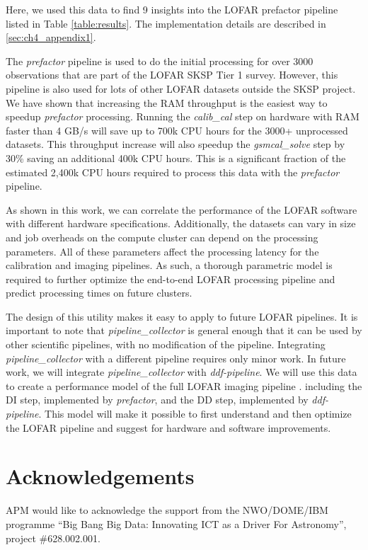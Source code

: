 Here, we used this data to find 9 insights into the LOFAR prefactor pipeline listed in Table \ref{table:results}. The implementation details are described in \ref{sec:ch4_appendix1}.

The \textit{prefactor} pipeline is used to do the initial processing for over 3000 observations that are part of the LOFAR SKSP Tier 1 survey. However, this pipeline is also used for lots of other LOFAR datasets outside the SKSP project. We have shown that increasing the RAM throughput is the easiest way to speedup \textit{prefactor} processing. Running the \textit{calib\_cal} step on hardware with RAM faster than 4 GB/s will save up to 700k CPU hours for the 3000+ unprocessed datasets. This throughput increase will also speedup the \textit{gsmcal\_solve} step by 30\% saving an additional 400k CPU hours. This is a significant fraction of the estimated 2,400k CPU hours required to process this data with the \textit{prefactor} pipeline. 

As shown in this work, we can correlate the performance of the LOFAR software with different hardware specifications. Additionally, the datasets  can vary in size and job overheads on the compute cluster can depend on the processing parameters. All of these parameters affect the processing latency for the calibration and imaging pipelines. As such, a thorough parametric model is required to further optimize the end-to-end LOFAR processing pipeline and predict processing times on future clusters.

The design of this utility makes it easy to apply to future LOFAR pipelines. It is important to note that \textit{pipeline\_collector} is general enough that it can be used by other scientific pipelines, with no modification of the pipeline. Integrating \textit{pipeline\_collector} with a different pipeline requires only minor work. In future work, we will integrate \textit{pipeline\_collector} with \textit{ddf-pipeline}. We will use this data to create a performance model of the full LOFAR imaging pipeline \citep{lofar_prefactor,Wendy_bootes,tassesmirnov}.  including the DI step, implemented by \textit{prefactor}, and  the DD step, implemented by \textit{ddf-pipeline}. This model will make it possible to first understand and then optimize the LOFAR pipeline and suggest for hardware and software improvements. 



\section*{Acknowledgements}
APM would like to acknowledge the support from the NWO/DOME/IBM programme ``Big Bang Big Data: Innovating ICT as a Driver For Astronomy'', project \#628.002.001.

